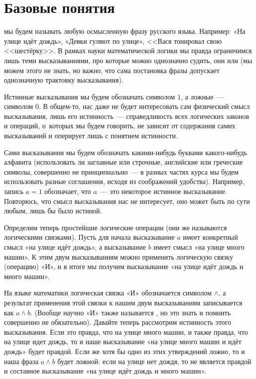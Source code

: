\section{Базовые понятия}

 мы будем называть любую осмысленную фразу русского языка. Например: «На улице идёт дождь», «Девки гуляют по улице», <<Вася тонировал свою <<шестёрку>>. В рамках науки математической логики мы правда ограничимся лишь теми высказываниями, про которые можно однозначно судить,  они или  (мы можем этого не знать, но важно, что сама постановка фразы допускает однозначную трактовку высказывания).

Истинные высказывания мы будем обозначать символом $1$, а ложные~--- символом $0$. В общем-то, нас даже не будет интересовать сам физический смысл высказывания, лишь его истинность~--- справедливость всех логических законов и операций, о~которых мы будем говорить, не зависит от содержания самих высказываний и оперирует лишь с понятием истинности.

Сами высказывания мы будем обозначать какими-нибудь буквами какого-нибудь алфавита (использовать ли заглавные или строчные, английские или греческие символы, совершенно не принципиально~--- в разных частях курса мы будем использовать разные соглашения, исходя из соображений удобства). Например, запись $a = 1$ обозначает, что $a$~--- это некоторое истинное высказывание. Повторюсь, что смысл высказывания нас не интересует, оно может быть по сути любым, лишь бы было истиной.

Определим теперь простейшие логические операции (они же называются логическими связками). Пусть для начала высказывание $a$ имеет конкретный смысл «на улице идёт дождь», а высказывание $b$ имеет смысл «на улице много машин». К этим двум высказываниям можно применить логическую связку (операцию) «И», и в итоге мы получим высказывание «на улице идёт дождь и много машин».

На языке математики логическая связка «И» обозначается символом $\land$, а результат применения этой связки к нашим двум высказываниям записывается как $a\land b$. (Вообще научно «И» также называется , но это знать и помнить совершенно не обязательно). Давайте теперь рассмотрим истинность этого высказывания. Если это правда, что на улице много машин, и также правда, что на улице идет дождь, то и наше высказывание «на улице много машин и идёт дождь» будет правдой. Если же хотя бы одно из этих утверждений ложно, то и наша фраза $a \land b$ будет ложной: если на улице нет дождя, то не является правдой и составное высказывание «на улице идёт дождь и много машин».

